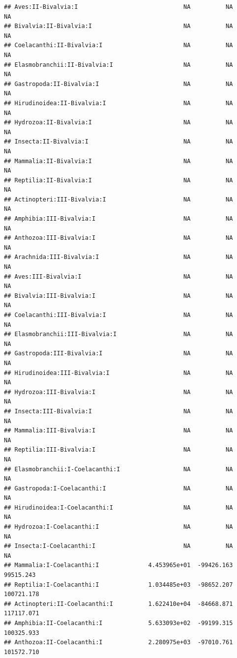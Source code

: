 \documentclass[
  12pt,
]{article}
\begin{document}
\begin{verbatim}
## Aves:II-Bivalvia:I                              NA          NA          NA
## Bivalvia:II-Bivalvia:I                          NA          NA          NA
## Coelacanthi:II-Bivalvia:I                       NA          NA          NA
## Elasmobranchii:II-Bivalvia:I                    NA          NA          NA
## Gastropoda:II-Bivalvia:I                        NA          NA          NA
## Hirudinoidea:II-Bivalvia:I                      NA          NA          NA
## Hydrozoa:II-Bivalvia:I                          NA          NA          NA
## Insecta:II-Bivalvia:I                           NA          NA          NA
## Mammalia:II-Bivalvia:I                          NA          NA          NA
## Reptilia:II-Bivalvia:I                          NA          NA          NA
## Actinopteri:III-Bivalvia:I                      NA          NA          NA
## Amphibia:III-Bivalvia:I                         NA          NA          NA
## Anthozoa:III-Bivalvia:I                         NA          NA          NA
## Arachnida:III-Bivalvia:I                        NA          NA          NA
## Aves:III-Bivalvia:I                             NA          NA          NA
## Bivalvia:III-Bivalvia:I                         NA          NA          NA
## Coelacanthi:III-Bivalvia:I                      NA          NA          NA
## Elasmobranchii:III-Bivalvia:I                   NA          NA          NA
## Gastropoda:III-Bivalvia:I                       NA          NA          NA
## Hirudinoidea:III-Bivalvia:I                     NA          NA          NA
## Hydrozoa:III-Bivalvia:I                         NA          NA          NA
## Insecta:III-Bivalvia:I                          NA          NA          NA
## Mammalia:III-Bivalvia:I                         NA          NA          NA
## Reptilia:III-Bivalvia:I                         NA          NA          NA
## Elasmobranchii:I-Coelacanthi:I                  NA          NA          NA
## Gastropoda:I-Coelacanthi:I                      NA          NA          NA
## Hirudinoidea:I-Coelacanthi:I                    NA          NA          NA
## Hydrozoa:I-Coelacanthi:I                        NA          NA          NA
## Insecta:I-Coelacanthi:I                         NA          NA          NA
## Mammalia:I-Coelacanthi:I              4.453965e+01  -99426.163   99515.243
## Reptilia:I-Coelacanthi:I              1.034485e+03  -98652.207  100721.178
## Actinopteri:II-Coelacanthi:I          1.622410e+04  -84668.871  117117.071
## Amphibia:II-Coelacanthi:I             5.633093e+02  -99199.315  100325.933
## Anthozoa:II-Coelacanthi:I             2.280975e+03  -97010.761  101572.710

\end{verbatim}
\end{document}

